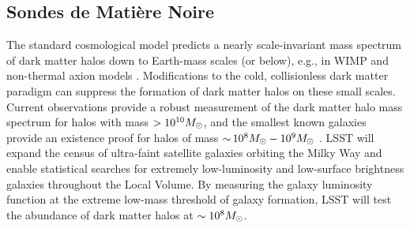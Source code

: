 \documentclass[12pt]{article}
\begin{document}

\vspace{-1em} \subsection*{Sondes de Matière Noire} \vspace{-0.5em}

The standard cosmological model predicts a nearly scale-invariant mass spectrum of dark matter halos down to Earth-mass scales (or below), e.g., in WIMP and non-thermal axion models \citep{Green:2003un,2005Natur.433..389D,1412.5930}.
Modifications to the cold, collisionless dark matter paradigm can suppress the formation of dark matter halos on these small scales.
Current observations provide a robust measurement of the dark matter halo mass spectrum for halos with mass $> 10^{10}M_\odot$, and the smallest known galaxies provide an existence proof for halos of mass $ {\sim}\, 10^8 M_\odot - 10^9 M_\odot$ \citep{2017MNRAS.467.2019R,behroozi2018,Jethwa:2018,Kim:2017iwr,Nadler:2018,1807.07093}. 
LSST will expand the census of ultra-faint satellite galaxies orbiting the Milky Way and enable statistical searches for extremely low-luminosity and low-surface brightness galaxies throughout the Local Volume.
By measuring the galaxy luminosity function at the extreme low-mass threshold of galaxy formation, LSST will test the abundance of dark matter halos at $\sim10^8 M_\odot$.
\end{document}

